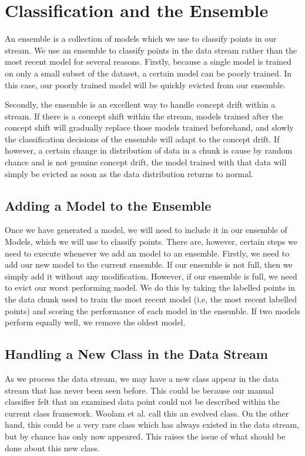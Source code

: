 \documentclass[12pt,a4paper,oneside]{report}
\begin{document}
\section*{Classification and the Ensemble}
 
An ensemble is a collection of models which we use to classify points in our stream. We use an ensemble to classify points in the data stream rather than the most recent model for several reasons. Firstly, because a single model is trained on only a small subset of the dataset, a certain model can be poorly trained. In this case, our poorly trained model will be quickly evicted from our ensemble. 

Secondly, the ensemble is an excellent way to handle concept drift within a stream. If there is a concept shift within the stream, models trained after the concept shift will gradually replace those models trained beforehand, and slowly the classification decisions of the ensemble will adapt to the concept drift. If however, a certain change in distribution of data in a chunk is cause by random chance and is not genuine concept drift, the model trained with that data will simply be evicted as soon as the data distribution returns to normal. 

\subsection*{Adding a Model to the Ensemble}

Once we have generated a model, we will need to include it in our ensemble of Models, which we will use to classify points. There are, however, certain steps we need to execute whenever we add an model to an ensemble. Firstly, we need to add our new model to the current ensemble. If our ensemble is not full, then we simply add it without any modification. However, if our ensemble is full, we need to evict our worst performing model. We do this by taking the labelled points in the data chunk used to train the most recent model (i.e, the most recent labelled points) and scoring the performance of each model in the ensemble. If two models perform equally well, we remove the oldest model.

\subsection*{Handling a New Class in the Data Stream}

As we process the data stream, we may have a new class appear in the data stream that has never been seen before. This could be because our manual classifier felt that an examined data point could not be described within the current class framework. Woolam et al.\cite{LabStr} call this an evolved class. On the other hand, this could be a very rare class which has always existed in the data stream, but by chance has only now appeared. This raises the issue of what should be done about this new class. 
\end{document}
